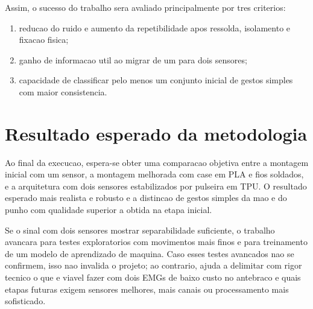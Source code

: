 \documentclass[12pt,oneside,a4paper,brazilian]{abntex2}
\begin{document}
Assim, o sucesso do trabalho sera avaliado principalmente por tres criterios:

\begin{enumerate}
  \item reducao do ruido e aumento da repetibilidade apos ressolda, isolamento e fixacao fisica;
  \item ganho de informacao util ao migrar de um para dois sensores;
  \item capacidade de classificar pelo menos um conjunto inicial de gestos simples com maior consistencia.
\end{enumerate}

\section{Resultado esperado da metodologia}

Ao final da execucao, espera-se obter uma comparacao objetiva entre a montagem inicial com um sensor, a montagem melhorada com case em PLA e fios soldados, e a arquitetura com dois sensores estabilizados por pulseira em TPU. O resultado esperado mais realista e robusto e a distincao de gestos simples da mao e do punho com qualidade superior a obtida na etapa inicial.

Se o sinal com dois sensores mostrar separabilidade suficiente, o trabalho avancara para testes exploratorios com movimentos mais finos e para treinamento de um modelo de aprendizado de maquina. Caso esses testes avancados nao se confirmem, isso nao invalida o projeto; ao contrario, ajuda a delimitar com rigor tecnico o que e viavel fazer com dois EMGs de baixo custo no antebraco e quais etapas futuras exigem sensores melhores, mais canais ou processamento mais sofisticado.
\end{document}
